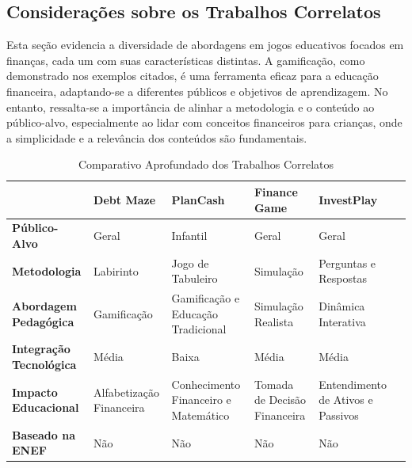 \subsection{Considerações sobre os Trabalhos Correlatos}
Esta seção evidencia a diversidade de abordagens em jogos educativos focados em finanças, cada um com suas características distintas. A gamificação, como demonstrado nos exemplos citados, é uma ferramenta eficaz para a educação financeira, adaptando-se a diferentes públicos e objetivos de aprendizagem. No entanto, ressalta-se a importância de alinhar a metodologia e o conteúdo ao público-alvo, especialmente ao lidar com conceitos financeiros para crianças, onde a simplicidade e a relevância dos conteúdos são fundamentais.


\begin{table}[ht]
	\centering
	\renewcommand{\arraystretch}{1.3}
	\caption{Comparativo Aprofundado dos Trabalhos Correlatos}
	\label{tab:comparativo-trabalhos}
	\begin{tabular}{| L{2.5cm} | L{2.6cm} | L{2.6cm} | L{2.6cm} | L{2.6cm} | L{2.6cm} |}
		\hline
		\textbf{}                       & \textbf{Debt Maze}       & \textbf{PlanCash}                    & \textbf{Finance Game}        & \textbf{InvestPlay}               \\
		\hline
		\hline
		\textbf{Público-Alvo}           & Geral                    & Infantil                             & Geral                        & Geral                             \\
		\hline
		\textbf{Metodologia}            & Labirinto                & Jogo de Tabuleiro                    & Simulação                    & Perguntas e Respostas             \\
		\hline
		\textbf{Abordagem Pedagógica}   & Gamificação              & Gamificação e Educação Tradicional   & Simulação Realista           & Dinâmica Interativa               \\
		\hline
		\textbf{Integração Tecnológica} & Média                    & Baixa                                & Média                        & Média                             \\
		\hline
		\textbf{Impacto Educacional}    & Alfabetização Financeira & Conhecimento Financeiro e Matemático & Tomada de Decisão Financeira & Entendimento de Ativos e Passivos \\
		\hline
		\textbf{Baseado na ENEF}        & Não                      & Não                                  & Não                          & Não                               \\
		\hline
	\end{tabular}
	\vspace{2mm}
\end{table}
